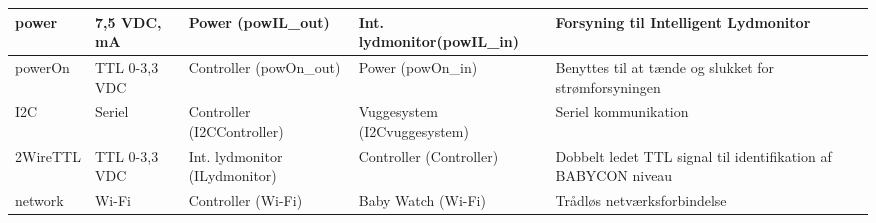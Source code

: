 \begin{center}
\begin{longtable}{|p{}|p{}|p{}|p{}|p{3cm}|}
power
&7,5 VDC, \newline 1500 mA
&Power \newline(powIL\_out)
&Int. lydmonitor\newline(powIL\_in)
&Forsyning til Intelligent Lydmonitor
\\\hline

powerOn			
&TTL 0-3,3 VDC				
&Controller \newline (powOn\_out) 			
&Power \newline (powOn\_in)	
&Benyttes til at tænde og slukket for strømforsyningen   		\\\hline

I2C			
&Seriel				
&Controller \newline (I2CController) 			
&Vuggesystem \newline (I2Cvuggesystem) 	
&Seriel kommunikation
\\\hline

2WireTTL			
&TTL 0-3,3 VDC					
&Int. lydmonitor \newline (ILydmonitor) 			
&Controller \newline (Controller) 	
&Dobbelt ledet TTL signal til identifikation af BABYCON niveau
\\\hline

network			
&Wi-Fi				
&Controller \newline (Wi-Fi) 			
&Baby Watch \newline (Wi-Fi)	
&Trådløs netværksforbindelse   				\\\hline

\end{longtable}
\end{center}